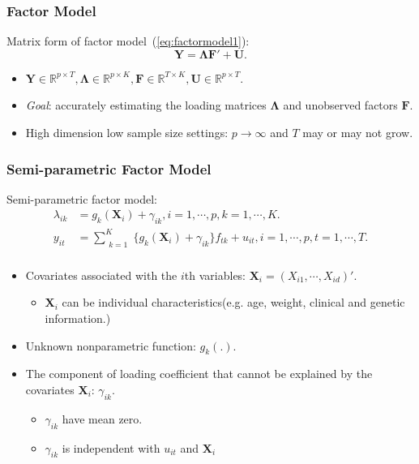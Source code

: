 \documentclass{beamer}
\newcommand{\R}{\mathbb R}
\newcommand{\bF}{\mathbf F}
\newcommand{\bU}{\mathbf U}
\newcommand{\bX}{\mathbf X}
\newcommand{\bY}{\mathbf Y}
\newcommand{\bLambda}{\boldsymbol{\Lambda}}
\begin{document}
\begin{frame}
\frametitle{Factor Model}
	
Matrix form of factor model~(\ref{eq:factormodel1}):
\begin{equation}
\label{eq:factormodel2}
\bY = \bLambda \bF' + \bU.
\end{equation}
\begin{itemize}
	\item $\bY \in \R^{p \times T}, \bLambda \in \R^{p \times K}, \bF \in \R^{T \times K}, \bU \in \R^{p \times T}$.
	\item \emph{Goal}: accurately estimating the loading matrices $\bLambda$ and unobserved factors $\bF$.
	\item High dimension low sample size settings: $p \to \infty$ and $T$ may or may not grow.
\end{itemize}    
\end{frame}



\begin{frame}
\frametitle{Semi-parametric Factor Model}

Semi-parametric factor model:
\begin{equation}
	\label{eq:semiparafactormodel1}
	\begin{aligned}
	\lambda_{ik} &= g_k(\bX_i) + \gamma_{ik}, i = 1, \cdots, p, k = 1, \cdots, K.\\ 
	y_{it} &= \sum_{\substack{k=1}}^{K} \{ g_k(\bX_i) + \gamma_{ik}\} f_{tk} + u_{it}, i = 1, \cdots, p, t = 1, \cdots, T.\\
	\end{aligned}
\end{equation}
\begin{itemize}
	\item Covariates associated with the $i$th variables: $\bX_i = (X_{i1}, \cdots, X_{id})'$.
	\begin{itemize}
		\item $\bX_i$ can be individual characteristics(e.g. age, weight, clinical and genetic information.)
	\end{itemize}
	\item Unknown nonparametric function: $g_k(.)$.
	\item The component of loading coefficient that cannot be explained by the covariates $\bX_i$: $\gamma_{ik}$.
	\begin{itemize}
		\item $\gamma_{ik}$ have mean zero.
		\item $\gamma_{ik}$ is independent with $u_{it}$ and $\bX_{i}$
	\end{itemize}
\end{itemize}
    
\end{frame}
\end{document}
